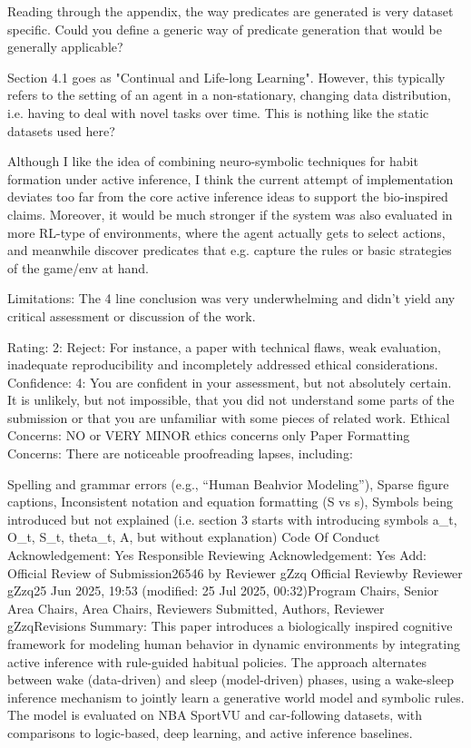 Reading through the appendix, the way predicates are generated is very dataset specific. Could you define a generic way of predicate generation that would be generally applicable?

Section 4.1 goes as "Continual and Life-long Learning". However, this typically refers to the setting of an agent in a non-stationary, changing data distribution, i.e. having to deal with novel tasks over time. This is nothing like the static datasets used here?

Although I like the idea of combining neuro-symbolic techniques for habit formation under active inference, I think the current attempt of implementation deviates too far from the core active inference ideas to support the bio-inspired claims. Moreover, it would be much stronger if the system was also evaluated in more RL-type of environments, where the agent actually gets to select actions, and meanwhile discover predicates that e.g. capture the rules or basic strategies of the game/env at hand.

Limitations:
The 4 line conclusion was very underwhelming and didn't yield any critical assessment or discussion of the work.

Rating: 2: Reject: For instance, a paper with technical flaws, weak evaluation, inadequate reproducibility and incompletely addressed ethical considerations.
Confidence: 4: You are confident in your assessment, but not absolutely certain. It is unlikely, but not impossible, that you did not understand some parts of the submission or that you are unfamiliar with some pieces of related work.
Ethical Concerns: NO or VERY MINOR ethics concerns only
Paper Formatting Concerns:
There are noticeable proofreading lapses, including:

Spelling and grammar errors (e.g., “Human Beahvior Modeling”),
Sparse figure captions,
Inconsistent notation and equation formatting (S vs s),
Symbols being introduced but not explained (i.e. section 3 starts with introducing symbols a_t, O_t, S_t, theta_t, A, but without explanation)
Code Of Conduct Acknowledgement: Yes
Responsible Reviewing Acknowledgement: Yes
Add:
Official Review of Submission26546 by Reviewer gZzq
Official Reviewby Reviewer gZzq25 Jun 2025, 19:53 (modified: 25 Jul 2025, 00:32)Program Chairs, Senior Area Chairs, Area Chairs, Reviewers Submitted, Authors, Reviewer gZzqRevisions
Summary:
This paper introduces a biologically inspired cognitive framework for modeling human behavior in dynamic environments by integrating active inference with rule-guided habitual policies. The approach alternates between wake (data-driven) and sleep (model-driven) phases, using a wake-sleep inference mechanism to jointly learn a generative world model and symbolic rules. The model is evaluated on NBA SportVU and car-following datasets, with comparisons to logic-based, deep learning, and active inference baselines.

